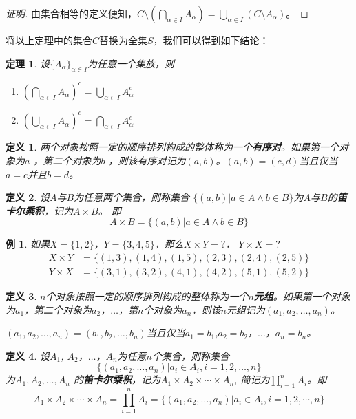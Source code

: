 \documentclass{book}[oneside]
\newtheorem{Def}{定义}[chapter]
\newtheorem{Thm}{定理}[chapter]
\newtheorem*{Example}{例}
\begin{document}
\begin{CJK*}{UTF8}{gbsn}
\begin{proof}[证明]
    由集合相等的定义便知，$C\setminus (\bigcap_{\alpha \in I}A_{\alpha})=\bigcup_{\alpha\in I}(C\setminus A_{\alpha})$。
  \end{proof}
将以上定理中的集合$C$替换为全集$S$，我们可以得到如下结论：
  \begin{Thm}
    设$\{A_{\alpha}\}_{\alpha \in I}$为任意一个集族，则
    \begin{enumerate}
    \item $(\bigcap_{\alpha \in I}A_{\alpha})^c=\bigcup_{\alpha\in I}A_{\alpha}^c$
    \item $(\bigcup_{\alpha \in I}A_{\alpha})^c=\bigcap_{\alpha\in I}A_{\alpha}^c$
    \end{enumerate}
    \end{Thm}
  \begin{Def}
    两个对象按照一定的顺序排列构成的整体称为一个{\bfseries 有序对}。如果第一个对象为$a$ ，第二个对象为$b$ ，则该有序对记为$(a,b)$。$(a,b)=(c,d)$当且仅当$a=c$并且$b=d$。
  \end{Def}
  \begin{Def}
    设$A$与$B$为任意两个集合，则称集合 $\{(a,b)|a\in A \land b \in B\}$为$A$与$B$的{\bfseries 笛卡尔乘积}，记为$A \times B$。
即
\begin{equation*}
  A \times B = \{(a,b)|a \in A \land b \in B\}
\end{equation*}
  \end{Def}
  \begin{Example}
    如果$X=\{1,2\}$，$Y=\{3,4,5\}$，那么$X \times Y = ?$， $Y \times X = ?$
    \begin{equation*}
      \begin{split}
       X \times Y &= \{ (1,3), (1,4), (1,5), (2,3), (2,4), (2, 5) \}\\
       Y \times X &= \{(3,1), (3,2), (4,1), (4,2), (5,1), (5,2)\}
      \end{split}
    \end{equation*}
  \end{Example}

  \begin{Def}
    $n$个对象按照一定的顺序排列构成的整体称为一个{\bfseries $n$元组}。如果第一个对象为$a_1$，第二个对象为$a_2$，$\ldots$，第$n$个对象为$a_n$，则该$n$元组记为$(a_1,a_2, \ldots, a_n)$。

 $(a_1,a_2, \ldots, a_n)=(b_1,b_2, \ldots, b_n)$当且仅当$a_1=b_1$,$a_2=b_2$，$\ldots$，$a_n=b_n$。
  \end{Def}
  \begin{Def}
    设$A_1$, $A_2$，$\ldots$，$A_n$为任意$n$个集合，则称集合 \[\{(a_1,a_2, \ldots, a_n)|a_i\in A_i, i = 1,2,\ldots, n\}\] 为$A_1, A_2, \ldots, A_n$ 的{\bfseries 笛卡尔乘积}，记为$A_1 \times A_2 \times \cdots \times A_n$, 简记为$\prod_{i=1}^nA_i$。即
\begin{equation*}
  A_1 \times A_2 \times \cdots \times A_n = \prod_{i=1}^nA_i = \{(a_1,a_2, \ldots, a_n)|a_i \in A_i, i = 1, 2, \cdots, n\}
\end{equation*}


\end{Def}
\end{CJK*}
\end{document}
